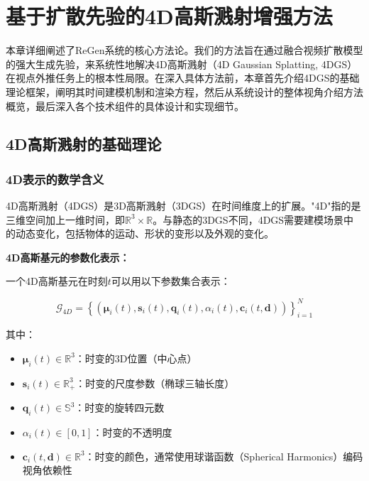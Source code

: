 
\chapter{基于扩散先验的4D高斯溅射增强方法}

本章详细阐述了ReGen系统的核心方法论。我们的方法旨在通过融合视频扩散模型的强大生成先验，来系统性地解决4D高斯溅射（4D Gaussian Splatting, 4DGS）在视点外推任务上的根本性局限。在深入具体方法前，本章首先介绍4DGS的基础理论框架，阐明其时间建模机制和渲染方程，然后从系统设计的整体视角介绍方法概览，最后深入各个技术组件的具体设计和实现细节。

\section{4D高斯溅射的基础理论}

\subsection{4D表示的数学含义}

4D高斯溅射（4DGS）是3D高斯溅射（3DGS）在时间维度上的扩展。"4D"指的是三维空间加上一维时间，即$\mathbb{R}^3 \times \mathbb{R}$。与静态的3DGS不同，4DGS需要建模场景中的动态变化，包括物体的运动、形状的变形以及外观的变化。

\textbf{4D高斯基元的参数化表示：}

一个4D高斯基元在时刻$t$可以用以下参数集合表示：

\begin{equation}
\mathcal{G}_{4D} = \left\{(\boldsymbol{\mu}_i(t), \mathbf{s}_i(t), \mathbf{q}_i(t), \alpha_i(t), \mathbf{c}_i(t, \mathbf{d}))\right\}_{i=1}^{N}
\label{eq:4dgs_parameterization}
\end{equation}

其中：
\begin{itemize}
\item $\boldsymbol{\mu}_i(t) \in \mathbb{R}^3$：时变的3D位置（中心点）
\item $\mathbf{s}_i(t) \in \mathbb{R}^3_+$：时变的尺度参数（椭球三轴长度）
\item $\mathbf{q}_i(t) \in \mathbb{S}^3$：时变的旋转四元数
\item $\alpha_i(t) \in [0,1]$：时变的不透明度
\item $\mathbf{c}_i(t, \mathbf{d}) \in \mathbb{R}^3$：时变的颜色，通常使用球谐函数（Spherical Harmonics）编码视角依赖性
\end{itemize}

